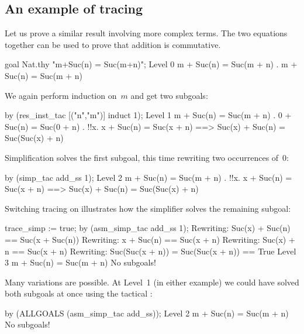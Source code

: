 \subsection{An example of tracing}
Let us prove a similar result involving more complex terms.  The two
equations together can be used to prove that addition is commutative.
\begin{ttbox}
goal Nat.thy "m+Suc(n) = Suc(m+n)";
{\out Level 0}
{\out m + Suc(n) = Suc(m + n)}
{. m + Suc(n) = Suc(m + n)}
\end{ttbox}
We again perform induction on~$m$ and get two subgoals:
\begin{ttbox}
by (res_inst_tac [("n","m")] induct 1);
{\out Level 1}
{\out m + Suc(n) = Suc(m + n)}
{. 0 + Suc(n) = Suc(0 + n)}
{. !!x. x + Suc(n) = Suc(x + n) ==>}
{\out          Suc(x) + Suc(n) = Suc(Suc(x) + n)}
\end{ttbox}
Simplification solves the first subgoal, this time rewriting two
occurrences of~0:
\begin{ttbox}
by (simp_tac add_ss 1);
{\out Level 2}
{\out m + Suc(n) = Suc(m + n)}
{. !!x. x + Suc(n) = Suc(x + n) ==>}
{\out          Suc(x) + Suc(n) = Suc(Suc(x) + n)}
\end{ttbox}
Switching tracing on illustrates how the simplifier solves the remaining
subgoal: 
\begin{ttbox}
trace_simp := true;
by (asm_simp_tac add_ss 1);
\ttbreak
{\out Rewriting:}
{\out Suc(x) + Suc(n) == Suc(x + Suc(n))}
\ttbreak
{\out Rewriting:}
{\out x + Suc(n) == Suc(x + n)}
\ttbreak
{\out Rewriting:}
{\out Suc(x) + n == Suc(x + n)}
\ttbreak
{\out Rewriting:}
{\out Suc(Suc(x + n)) = Suc(Suc(x + n)) == True}
\ttbreak
{\out Level 3}
{\out m + Suc(n) = Suc(m + n)}
{\out No subgoals!}
\end{ttbox}
Many variations are possible.  At Level~1 (in either example) we could have
solved both subgoals at once using the tactical :
\begin{ttbox}
by (ALLGOALS (asm_simp_tac add_ss));
{\out Level 2}
{\out m + Suc(n) = Suc(m + n)}
{\out No subgoals!}
\end{ttbox}

